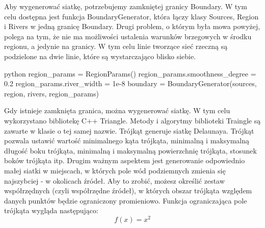 \documentclass[]{pracamgr}
\begin{document}
      Aby wygenerować siatkę, potrzebujemy zamkniętej granicy Boundary. W tym celu dostępna jest funkcja BoundaryGenerator, która łączy klasy Sources, Region i Rivers w jedną granicę Boundary. Drugi problem, o którym była mowa powyżej, polega na tym, że nie ma możliwości ustalenia warunków brzegowych w środku regionu, a jedynie na granicy. W tym celu linie tworzące sieć rzeczną są podzielone na dwie linie, które są wystarczająco blisko siebie.

      \begin{mintedbox}{python}
        region_params = RegionParams()
        region_params.smoothness_degree = 0.2
        region_params.river_width = 1e-8
        boundary = BoundaryGenerator(sources, region, rivers, region_params)\end{mintedbox}

      Gdy istnieje zamknięta granica, można wygenerować siatkę. W tym celu wykorzystano bibliotekę C++ Triangle\cite{szewczuk1996triangle}. Metody i algorytmy biblioteki Traingle są zawarte w klasie o tej samej nazwie. Trójkąt generuje siatkę Delaunaya. Trójkąt pozwala ustawić wartość minimalnego kąta trójkąta, minimalną i maksymalną długość boku trójkąta, minimalną i maksymalną powierzchnię trójkąta, stosunek boków trójkąta itp. Drugim ważnym aspektem jest generowanie odpowiednio małej siatki w miejscach, w których pole wód podziemnych zmienia się najszybciej - w okolicach źródeł. Aby to zrobić, możesz określić zestaw współrzędnych (czyli współrzędne źródeł), w których obszar trójkąta względem danych punktów będzie ograniczony promieniowo. Funkcja ograniczająca pole trójkąta wygląda następująco:
      \begin{equation}
        f(x) = x^{2}
      \end{equation}
\end{document}
